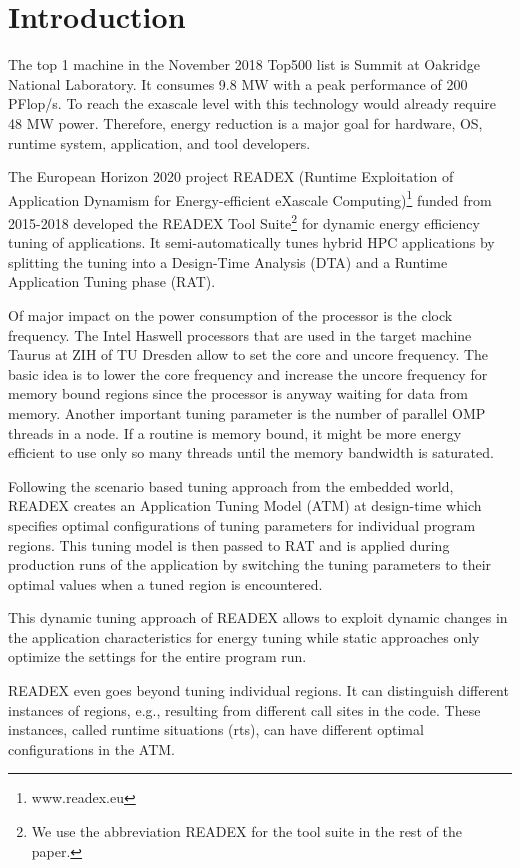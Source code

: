 \documentclass[runningheads]{llncs}
\begin{document}
\section{Introduction} \label{sec:introduction}

The top 1 machine in the November 2018 Top500 list is Summit at Oakridge National Laboratory. It consumes 9.8 MW with a peak performance of 200 PFlop/s. To reach the exascale level with this technology would already require 48 MW power. Therefore, energy reduction is a major goal for hardware, OS, runtime system, application, and tool developers. 

The European Horizon 2020 project READEX (Runtime Exploitation of Application Dynamism for Energy-efficient eXascale Computing)\footnote{www.readex.eu} funded from 2015-2018 developed the READEX Tool Suite\footnote{We use the abbreviation READEX for the tool suite in the rest of the paper.} for dynamic energy efficiency tuning of applications. It semi-automatically tunes hybrid HPC applications by splitting the tuning into a Design-Time Analysis (DTA) and a Runtime Application Tuning phase (RAT). 

Of major impact on the power consumption of the processor is the clock frequency. The Intel Haswell processors that are used in the target machine Taurus at ZIH of TU Dresden allow to set the core and  uncore frequency. The basic idea is to lower the core frequency and increase the uncore frequency for memory bound regions since the processor is anyway waiting for data from memory.  Another important tuning parameter is the number of parallel OMP threads in a node. If a routine is memory bound, it might be more energy efficient to use only so many threads until the memory bandwidth is saturated. 

Following the scenario based tuning approach \cite{filippopoulos2013exploration} from the embedded world, READEX creates an Application Tuning Model (ATM) at design-time which specifies optimal configurations of tuning parameters for individual program regions. This tuning model is then passed to RAT and is applied during production runs of the application by switching the tuning parameters to their optimal values when a tuned region is encountered. 

This dynamic tuning approach of READEX allows to exploit dynamic changes in the application characteristics for energy tuning while static approaches only optimize the settings for the entire program run. 

READEX even goes beyond tuning individual regions. It can distinguish different instances of regions, e.g., resulting from different call sites in the code. These instances, called runtime situations (rts), can have different optimal configurations in the ATM. 
\end{document}

